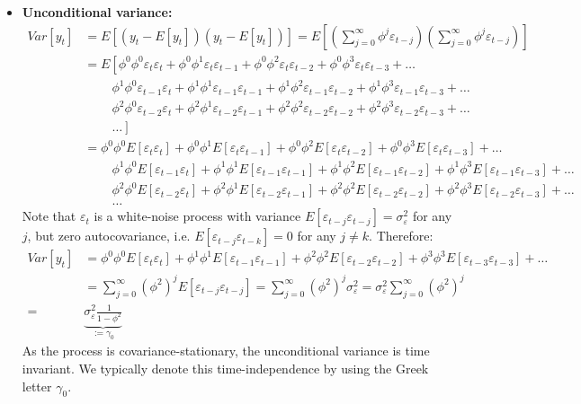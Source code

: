 \begin{enumerate}
\begin{itemize}
\item \textbf{Unconditional variance:}
\begin{align*}
Var[y_t] &= E\left[(y_t -E[y_t])(y_t - E[y_t])\right] = E\left[\left(\sum_{j=0}^\infty \phi^j \varepsilon_{t-j}\right) \left(\sum_{j=0}^\infty \phi^j \varepsilon_{t-j}\right) \right]
\\
&= E\left[ \phi^0 \phi^0 \varepsilon_{t} \varepsilon_{t} + \phi^0 \phi^1 \varepsilon_{t} \varepsilon_{t-1} + \phi^0 \phi^2 \varepsilon_{t} \varepsilon_{t-2} + \phi^0 \phi^3 \varepsilon_{t} \varepsilon_{t-3} + \ldots \right.
\\
& \qquad~\phi^1 \phi^0 \varepsilon_{t-1} \varepsilon_{t} + \phi^1 \phi^1 \varepsilon_{t-1} \varepsilon_{t-1} + \phi^1 \phi^2 \varepsilon_{t-1} \varepsilon_{t-2} + \phi^1 \phi^3 \varepsilon_{t-1} \varepsilon_{t-3} + \ldots
\\
& \qquad~\phi^2 \phi^0 \varepsilon_{t-2} \varepsilon_{t} + \phi^2 \phi^1 \varepsilon_{t-2} \varepsilon_{t-1} + \phi^2 \phi^2 \varepsilon_{t-2} \varepsilon_{t-2} + \phi^2 \phi^3 \varepsilon_{t-2} \varepsilon_{t-3} + \ldots
\\
&\left.\qquad~\ldots\right]
\\
&= \phi^0 \phi^0 E[\varepsilon_{t} \varepsilon_{t}] + \phi^0 \phi^1 E[\varepsilon_{t} \varepsilon_{t-1}] + \phi^0 \phi^2 E[\varepsilon_{t} \varepsilon_{t-2}] + \phi^0 \phi^3 E[\varepsilon_{t} \varepsilon_{t-3}] + \ldots
\\
& \qquad~\phi^1 \phi^0 E[\varepsilon_{t-1} \varepsilon_{t}] + \phi^1 \phi^1 E[\varepsilon_{t-1} \varepsilon_{t-1}] + \phi^1 \phi^2 E[\varepsilon_{t-1} \varepsilon_{t-2}] + \phi^1 \phi^3 E[\varepsilon_{t-1} \varepsilon_{t-3}] + \ldots
\\
& \qquad~\phi^2 \phi^0 E[\varepsilon_{t-2} \varepsilon_{t}] + \phi^2 \phi^1 E[\varepsilon_{t-2} \varepsilon_{t-1}] + \phi^2 \phi^2 E[\varepsilon_{t-2} \varepsilon_{t-2}] + \phi^2 \phi^3 E[\varepsilon_{t-2} \varepsilon_{t-3}] + \ldots
\\
&\qquad~\ldots
\end{align*}
Note that \(\varepsilon_t \) is a white-noise process with variance \(E[\varepsilon_{t-j} \varepsilon_{t-j}]=\sigma_\varepsilon^2\) for any \(j\),
  but zero autocovariance, i.e. \(E[\varepsilon_{t-j} \varepsilon_{t-k}]=0\) for any \(j \neq k\).
Therefore:
\begin{align*}
Var[y_t] &= \phi^0 \phi^0 E[\varepsilon_{t} \varepsilon_{t}] + \phi^1 \phi^1 E[\varepsilon_{t-1} \varepsilon_{t-1}] + \phi^2 \phi^2 E[\varepsilon_{t-2} \varepsilon_{t-2}] + \phi^3 \phi^3 E[\varepsilon_{t-3} \varepsilon_{t-3}] + \ldots
\\
&= \sum_{j=0}^\infty {(\phi^{2})}^j E[\varepsilon_{t-j} \varepsilon_{t-j}]
= \sum_{j=0}^\infty {(\phi^{2})}^j \sigma_\varepsilon^2
= \sigma_\varepsilon^2 \sum_{j=0}^\infty {(\phi^{2})}^j
\\
=& \underbrace{\sigma_\varepsilon^2 \frac{1}{1-\phi^2}}_{:= \gamma_0}
\end{align*}
As the process is covariance-stationary, the unconditional variance is time invariant.
We typically denote this time-independence by using the Greek letter \(\gamma_0\).


\end{itemize}
\end{enumerate}
